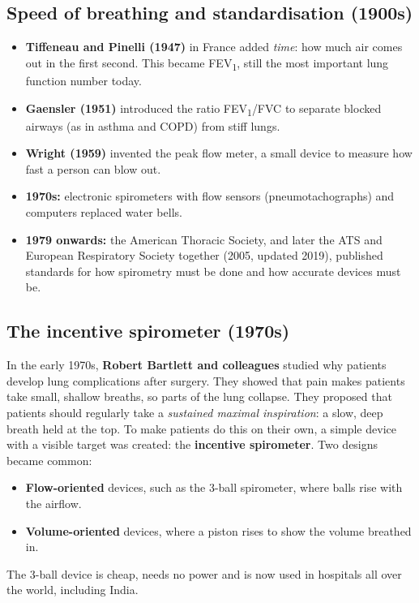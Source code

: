\documentclass[12pt,a4paper]{article}
\begin{document}
\subsection{Speed of breathing and standardisation (1900s)}
\begin{itemize}
  \item \textbf{Tiffeneau and Pinelli (1947)} in France added \emph{time}: how much air comes out in the first second. This became FEV\textsubscript{1}, still the most important lung function number today.
  \item \textbf{Gaensler (1951)} introduced the ratio FEV\textsubscript{1}/FVC to separate blocked airways (as in asthma and COPD) from stiff lungs.
  \item \textbf{Wright (1959)} invented the peak flow meter, a small device to measure how fast a person can blow out.
  \item \textbf{1970s:} electronic spirometers with flow sensors (pneumotachographs) and computers replaced water bells.
  \item \textbf{1979 onwards:} the American Thoracic Society, and later the ATS and European Respiratory Society together (2005, updated 2019), published standards for how spirometry must be done and how accurate devices must be.
\end{itemize}

\subsection{The incentive spirometer (1970s)}
In the early 1970s, \textbf{Robert Bartlett and colleagues} studied why patients develop lung complications after surgery. They showed that pain makes patients take small, shallow breaths, so parts of the lung collapse. They proposed that patients should regularly take a \emph{sustained maximal inspiration}: a slow, deep breath held at the top. To make patients do this on their own, a simple device with a visible target was created: the \textbf{incentive spirometer}. Two designs became common:
\begin{itemize}
  \item \textbf{Flow-oriented} devices, such as the 3-ball spirometer, where balls rise with the airflow.
  \item \textbf{Volume-oriented} devices, where a piston rises to show the volume breathed in.
\end{itemize}
The 3-ball device is cheap, needs no power and is now used in hospitals all over the world, including India.
\end{document}
